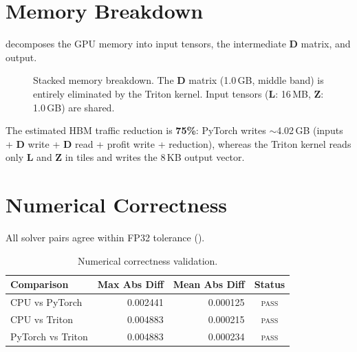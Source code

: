 \section{Memory Breakdown}

 decomposes the GPU memory into input tensors, the intermediate $\mathbf{D}$ matrix, and output.

\begin{figure}[H]
\centering
{}
\caption{Stacked memory breakdown. The $\mathbf{D}$ matrix (1.0\,GB, middle band) is entirely eliminated by the Triton kernel. Input tensors ($\mathbf{L}$: 16\,MB, $\mathbf{Z}$: 1.0\,GB) are shared.}
\label{fig:membreak}
\end{figure}

The estimated HBM traffic reduction is \textbf{75\%}: PyTorch writes $\sim$4.02\,GB (inputs + $\mathbf{D}$ write + $\mathbf{D}$ read + profit write + reduction), whereas the Triton kernel reads only $\mathbf{L}$ and $\mathbf{Z}$ in tiles and writes the 8\,KB output vector.

\section{Numerical Correctness}

All solver pairs agree within FP32 tolerance ().

\begin{table}[H]
\centering\small
\caption{Numerical correctness validation.}
\label{tab:correct}
\begin{tabular}{@{} l r r c @{}}
    \toprule
    \textbf{Comparison} & \textbf{Max Abs Diff} & \textbf{Mean Abs Diff} & \textbf{Status} \\
    \midrule
    CPU vs PyTorch      & 0.002441 & 0.000125 & \textsc{pass} \\
    CPU vs Triton       & 0.004883 & 0.000215 & \textsc{pass} \\
    PyTorch vs Triton   & 0.004883 & 0.000234 & \textsc{pass} \\
    \bottomrule
\end{tabular}
\end{table}

